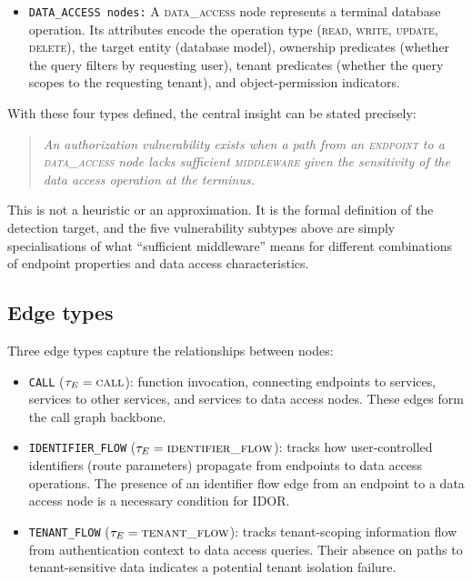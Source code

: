 \begin{itemize}
\item \texttt{DATA\_ACCESS nodes:} A \textsc{data\_access} node represents a terminal database operation. Its
attributes encode the operation type (\textsc{read}, \textsc{write},
\textsc{update}, \textsc{delete}), the target entity (database model),
ownership predicates (whether the query filters by requesting user), tenant
predicates (whether the query scopes to the requesting tenant), and
object-permission indicators.

\end{itemize}

With these four types defined, the central insight can be stated precisely:
\begin{quote}
\emph{An authorization vulnerability exists when a path from an
\textsc{endpoint} to a \textsc{data\_access} node lacks sufficient
\textsc{middleware} given the sensitivity of the data access operation at
the terminus.}
\end{quote}
This is not a heuristic or an approximation. It is the formal definition of
the detection target, and the five vulnerability subtypes above are simply
specialisations of what ``sufficient middleware'' means for different
combinations of endpoint properties and data access characteristics.



\subsection{Edge types}
\label{sec:det-edges}

Three edge types capture the relationships between nodes:
\begin{itemize}
    \item \texttt{CALL} ($\tau_E = \textsc{call}$): function invocation,
    connecting endpoints to services, services to other services, and
    services to data access nodes. These edges form the call graph backbone.

    \item \texttt{IDENTIFIER\_FLOW} ($\tau_E = \textsc{identifier\_flow}$):
    tracks how user-controlled identifiers (route parameters) propagate from
    endpoints to data access operations. The presence of an identifier flow
    edge from an endpoint to a data access node is a necessary condition for
    IDOR.

    \item \texttt{TENANT\_FLOW} ($\tau_E = \textsc{tenant\_flow}$): tracks
    tenant-scoping information flow from authentication context to data
    access queries. Their absence on paths to tenant-sensitive data indicates
    a potential tenant isolation failure.
\end{itemize}

